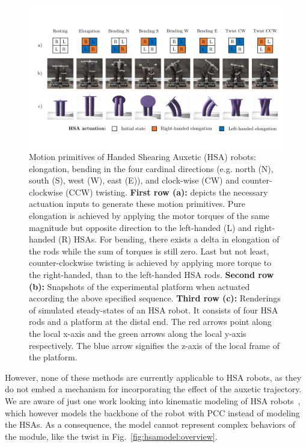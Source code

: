 \begin{figure}[hbt]
    \centering
    \includegraphics[width=1.0\textwidth]{hsamodel/figures/motion_primitives/motion_primitives_v2_compressed.pdf}
    
    \caption{Motion primitives of Handed Shearing Auxetic (HSA) robots: elongation, bending in the four cardinal directions (e.g. north (N), south (S), west (W), east (E)), and clock-wise (CW) and counter-clockwise (CCW) twisting.
    \textbf{First row (a):} depicts the necessary actuation inputs to generate these motion primitives. Pure elongation is achieved by applying the motor torques of the same magnitude but opposite direction to the left-handed (L) and right-handed (R) HSAs. For bending, there exists a delta in elongation of the rods while the sum of torques is still zero. Last but not least, counter-clockwise twisting is achieved by applying more torque to the right-handed, than to the left-handed HSA rods.
    \textbf{Second row (b):} Snapshots of the experimental platform when actuated according the above specified sequence.
    \textbf{Third row (c):} Renderings of simulated steady-states of an HSA robot. It consists of four HSA rods and a platform at the distal end. The red arrows point along the local x-axis and the green arrows along the local y-axis respectively. The blue arrow signifies the z-axis of the local frame of the platform.}\label{fig:hsamodel:motion_primitives}
\end{figure}

However, none of these methods are currently applicable to HSA robots, as they do not embed a mechanism for incorporating the effect of the auxetic trajectory.
%
We are aware of just one work looking into kinematic modeling of HSA robots~\cite{garg2022kinematic}, which however models the backbone of the robot with \gls{PCC} instead of modeling the HSAs. As a consequence, the model cannot represent complex behaviors of the module, like the twist in Fig.~\ref{fig:hsamodel:overview}. 


